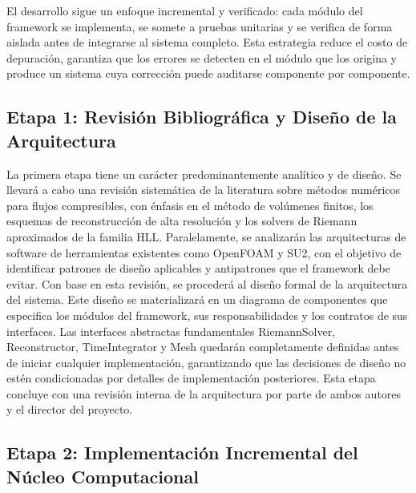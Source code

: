 \documentclass[11pt,openany]{book}
\begin{document}
El desarrollo sigue un enfoque incremental y verificado: cada módulo del framework se implementa, se somete a pruebas unitarias y se verifica de forma aislada antes de integrarse al sistema completo. Esta estrategia reduce el costo de depuración, garantiza que los errores se detecten en el módulo que los origina y produce un sistema cuya corrección puede auditarse componente por componente.

\subsection{Etapa 1: Revisión Bibliográfica y Diseño de la Arquitectura}

La primera etapa tiene un carácter predominantemente analítico y de diseño. Se llevará a cabo una revisión sistemática de la literatura sobre métodos numéricos para flujos compresibles, con énfasis en el método de volúmenes finitos, los esquemas de reconstrucción de alta resolución y los solvers de Riemann aproximados de la familia HLL. Paralelamente, se analizarán las arquitecturas de software de herramientas existentes como OpenFOAM y SU2, con el objetivo de identificar patrones de diseño aplicables y antipatrones que el framework debe evitar.
Con base en esta revisión, se procederá al diseño formal de la arquitectura del sistema. Este diseño se materializará en un diagrama de componentes que especifica los módulos del framework, sus responsabilidades y los contratos de sus interfaces. Las interfaces abstractas fundamentales RiemannSolver, Reconstructor, TimeIntegrator y Mesh quedarán completamente definidas antes de iniciar cualquier implementación, garantizando que las decisiones de diseño no estén condicionadas por detalles de implementación posteriores. Esta etapa concluye con una revisión interna de la arquitectura por parte de ambos autores y el director del proyecto.

\subsection{Etapa 2: Implementación Incremental del Núcleo Computacional}
\end{document}
